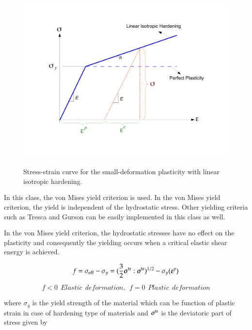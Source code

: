 \noindent 
\begin{figure}[htp]
  \centering
   {\includegraphics[scale=0.4, clip]{figures/isotropic_hardening_plasticity.pdf}}
   \caption{
    Stress-strain curve for the small-deformation plasticity with linear isotropic hardening.
   }
  \label{fig:smm:cl:Lin-strain-hard}
\end{figure}

\noindent In this class, the von Mises yield criterion is used. In the von Mises yield criterion, the yield is independent of the hydrostatic stress. Other yielding criteria such as Tresca and Gurson can be easily implemented in this class as well.

In the von Mises yield criterion, the hydrostatic stresses have no effect on the plasticity and consequently the yielding occurs when a critical elastic shear energy is achieved.

\begin{equation} \label{eqn:smm:constitutive:von Mises}
	f = \sigma_{{\mathrm{eff}}} - \sigma_y = (\frac{3}{2} {\boldsymbol{\sigma}}^{{\mathrm{tr}}} : {\boldsymbol{\sigma}}^{{\mathrm{tr}}})^{1/2}-\sigma_y (\boldsymbol{\varepsilon}^p)
\end{equation}

\begin{equation} \label{eqn:smm:constitutive:yielding}
 	f < 0 \   \  Elastic \  \ deformation, \                                   \
	f = 0 \   \  Plastic \  \ deformation
\end{equation}

where $\sigma_y$ is the yield strength of the material which can be function of plastic strain in case of hardening type of materials and ${\boldsymbol{\sigma}}^{{\mathrm{tr}}}$ is the deviatoric part of stress given by

